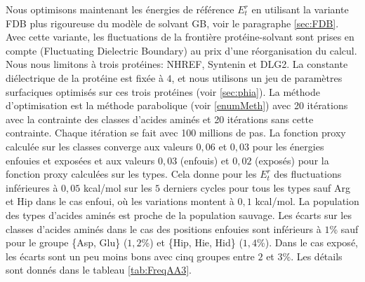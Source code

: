 Nous optimisons maintenant les énergies de référence $E_t^r$ en utilisant la variante FDB plus rigoureuse du modèle de solvant GB, voir le paragraphe \ref{sec:FDB}. Avec cette variante, les fluctuations de la frontière protéine-solvant sont prises en compte (\og Fluctuating Dielectric Boundary\fg) au prix d'une réorganisation du calcul. Nous nous limitons à trois protéines: NHREF, Syntenin et DLG2. La constante diélectrique de la protéine est fixée à $4$, et nous utilisons un jeu de paramètres surfaciques optimisés sur ces trois protéines (voir \ref{sec:phia}). La méthode d'optimisation est la méthode parabolique (voir \ref{enumMeth}) avec 20 itérations avec la contrainte des classes d'acides aminés et 20 itérations sans cette contrainte. Chaque itération se fait avec 100 millions de pas. La fonction proxy calculée sur les classes converge aux valeurs $0,06$ et $0,03$ pour les énergies enfouies et exposées et aux valeurs $0,03$ (enfouis) et $0,02$ (exposés) pour la fonction proxy calculées sur les types. Cela donne pour les $E_t^r$ des fluctuations inférieures à $0,05$ kcal/mol sur les $5$ derniers cycles pour tous les types sauf Arg et Hip dans le cas enfoui, où les variations montent à $0,1$ kcal/mol. La population des types d'acides aminés est proche de la population sauvage. Les écarts sur les classes d'acides aminés dans le cas des positions enfouies sont inférieurs à $1$\%  sauf pour le groupe \{Asp, Glu\} ($1,2$\%)  et \{Hip, Hie, Hid\} ($1,4$\%). Dans le cas exposé, les écarts sont un peu moins bons avec cinq groupes entre $2$ et $3$\%. Les détails sont donnés dans le tableau \ref{tab:FreqAA3}.

